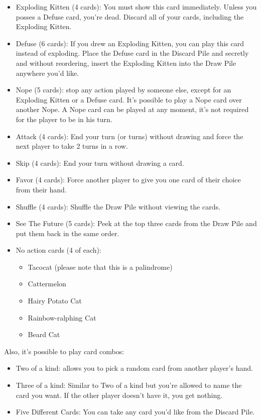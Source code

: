 \documentclass[11pt, fuzz]{article}
\begin{document}
\begin{itemize}
    \item Exploding Kitten (4 cards): You must show this card immediately. Unless you posses a Defuse card, you're dead. Discard all of your cards, including the Exploding Kitten. 
    \item Defuse (6 cards): If you drew an Exploding Kitten, you can play this card instead of exploding. Place the Defuse card in the Discard Pile and secretly and without reordering, insert the Exploding Kitten into the Draw Pile anywhere you'd like. 
    \item Nope (5 cards): stop any action played by someone else, except for an Exploding Kitten or a Defuse card. It's possible to play a Nope card over another Nope. A Nope card can be played at any moment, it's not required for the player to be in his turn. 
    \item Attack (4 cards): End your turn (or turns) without drawing and force the next player to take 2 turns in a row. 
    \item Skip (4 cards): End your turn without drawing a card. 
    \item Favor (4 cards): Force another player to give you one card of their choice from their hand. 
    \item Shuffle (4 cards): Shuffle the Draw Pile without viewing the cards.
    \item See The Future (5 cards): Peek at the top three cards from the Draw Pile and put them back in the same order. 
    \item No action cards (4 of each):
        \begin{itemize}
            \item Tacocat (please note that this is a palindrome)
            \item Cattermelon
            \item Hairy Potato Cat
            \item Rainbow-ralphing Cat
            \item Beard Cat
        \end{itemize}
\end{itemize}

Also, it's possible to play card combos:

\begin{itemize}
    \item Two of a kind: allows you to pick a random card from another player's hand. 
    \item Three of a kind: Similar to Two of a kind but you're allowed to name the card you want. If the other player doesn't have it, you get nothing. 
    \item Five Different Cards: You can take any card you'd like from the Discard Pile. 
\end{itemize}
\end{document}
